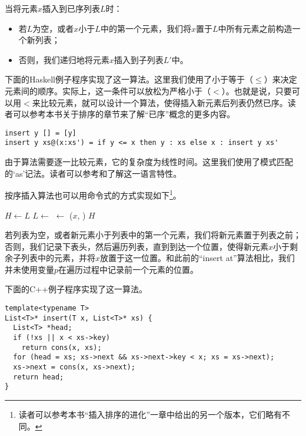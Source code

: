 \documentclass[UTF8]{article}
\begin{document}
当将元素$x$插入到已序列表$L$时：

\begin{itemize}
\item 若$L$为空，或者$x$小于$L$中的第一个元素，我们将$x$置于$L$中所有元素之前构造一个新列表；
\item 否则，我们递归地将元素$x$插入到子列表$L'$中。
\end{itemize}

下面的Haskell例子程序实现了这一算法。这里我们使用了小于等于（$\leq$）来决定元素间的顺序。实际上，这一条件可以放松为严格小于（$<$）。也就是说，只要可以用$<$来比较元素，就可以设计一个算法，使得插入新元素后列表仍然已序。读者可以参考本书关于排序的章节来了解“已序”概念的更多内容。

\lstset{language=Haskell}
\begin{lstlisting}
insert y [] = [y]
insert y xs@(x:xs') = if y <= x then y : xs else x : insert y xs'
\end{lstlisting}

由于算法需要逐一比较元素，它的复杂度为线性时间。这里我们使用了模式匹配的‘as’记法。读者可以参考\cite{learn-haskell}和\cite{algo-fp}了解这一语言特性。

按序插入算法也可以用命令式的方式实现如下\footnote{读者可以参考本书“插入排序的进化”一章中给出的另一个版本，它们略有不同。}。

\begin{algorithmic}[1]
    \State \Return {}
  \EndIf
  \State $H \gets L$
    \State $L \gets $ 
  \EndWhile
  \State {} $\gets$ ($x$, )
  \State \Return $H$
\EndFunction
\end{algorithmic}

若列表为空，或者新元素小于列表中的第一个元素，我们将新元素置于列表之前；否则，我们记录下表头，然后遍历列表，直到到达一个位置，使得新元素$x$小于剩余子列表中的元素，并将$x$放置于这一位置。和此前的“insert at”算法相比，我们并未使用变量$p$在遍历过程中记录前一个元素的位置。

下面的C++例子程序实现了这一算法。

\lstset{language=C++}
\begin{lstlisting}
template<typename T>
List<T>* insert(T x, List<T>* xs) {
  List<T> *head;
  if (!xs || x < xs->key)
    return cons(x, xs);
  for (head = xs; xs->next && xs->next->key < x; xs = xs->next);
  xs->next = cons(x, xs->next);
  return head;
}
\end{lstlisting}
\end{document}
